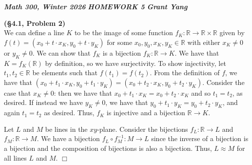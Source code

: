 \documentclass[12pt]{article}
\theoremstyle{definition}
\newenvironment{Solution}{\noindent {\sc Solution.}}{$\Box$ \vspace{2 ex}}
\begin{document}

    
\noindent \textit{\textbf{Math 300, Winter 2026}} \hspace{1.3cm} \textit{\textbf{HOMEWORK 5}} \hspace{1.3cm} 
\textit{\textbf{Grant Yang}
} 

\vspace{0.5cm}

\begin{Solution}
{\bf (\S4.1, Problem 2)}\\
We can define a line $K$ to be the image of some function $f_K : \mathbb R \to \mathbb R \times \mathbb R$ given by $f(t) = (x_0+t\cdot x_K,y_0 +t\cdot y_K)$ for some $x_0,y_0,x_K, y_K \in \mathbb R$ with either $x_K \ne 0$ or $y_K \ne 0$. We can show that $f_K$ is a bijection $f_K : \mathbb R \to K$. We have that $K = f_K(\mathbb R)$ by definition, so we have surjectivity. To show injectivity, let $t_1,t_2 \in \mathbb R$ be elements such that $f(t_1) = f(t_2)$.  From the definition of $f$, we have that $(x_0 +t_1\cdot x_K, y_0+t_1\cdot y_K) = (x_0 + t_2\cdot x_K, y_0 + t_2\cdot y_K)$. Consider the case that $x_K \ne 0$: then we have that $x_0 +t_1\cdot x_K = x_0+t_2\cdot x_K$ and so $t_1 = t_2$, as desired. If instead we have $y_K \ne 0$, we have that $y_0 + t_1 \cdot y_K = y_0 + t_2 \cdot y_K$, and again $t_1 = t_2$ as desired. Thus, $f_K$ is injective and a bijection $\mathbb R \to K$.

Let $L$ and $M$ be lines in the $xy$-plane. Consider the bijections $f_L : \mathbb R \to L$ and $f_M : \mathbb R \to M$. We have a bijection $f_L \circ f_M^{-1} : M \to L$ since the inverse of a bijection is a bijection and the composition of bijections is also a bijection. Thus, $L \approx M$ for all lines $L$ and $M$.
\end{Solution}
\end{document}
